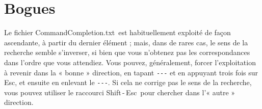 \documentclass[11pt,french]{article}
\newcommand{\ctlkey}{\textsf{Ctl}}
\newcommand{\cmdkey}{\textsf{Cmd}}
\newcommand{\esckey}{\textsf{Esc}}
\newcommand{\shiftkey}{\textsf{Shift}}
\newcommand{\mnu}[1]{\textsf{#1}}
\newcommand{\To}{\,\(\to\)\,}
\newcommand{\CCT}{\textsf{CommandCompletion.txt}}
\begin{document}

\section*{Bogues}

Le fichier \CCT\ est habituellement exploité de façon ascendante, à partir du dernier élément ; mais, dans de rares cas, le sens de la recherche semble s'inverser, si bien que vous n'obtenez pas les correspondances dans l'ordre que vous attendiez. Vous pouvez, généralement, forcer l'exploitation à revenir dans la « bonne » direction, en tapant \verb+---+ et en appuyant trois fois sur \esckey, et ensuite en enlevant le  \verb+---+. Si cela ne corrige pas le sens de la recherche, vous pouvez utiliser le raccourci \shiftkey\,-\,\esckey\ pour chercher dans l'« autre » direction.
\end{document}
